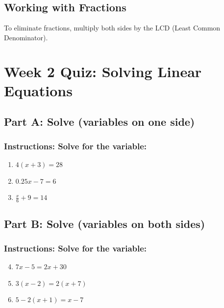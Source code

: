 \documentclass[12pt]{article}
\begin{document}
	    \subsection*{Working with Fractions}
        	To eliminate fractions, multiply both sides by the LCD (Least Common Denominator).

            \newpage

    \section*{Week 2 Quiz: Solving Linear Equations}
	
        \subsection*{Part A: Solve (variables on one side)}
            
            \subsubsection*{Instructions: Solve for the variable:}

                \begin{enumerate}
                    \item $4(x + 3) = 28$
                    \item $0.25x - 7 = 6$
                    \item $\frac{x}{6} + 9 = 14$
                \end{enumerate}
        
        \subsection*{Part B: Solve (variables on both sides)}
            
            \subsubsection*{Instructions: Solve for the variable:}

                \begin{enumerate}
                    \setcounter{enumi}{3}
                    \item $7x - 5 = 2x + 30$
                    \item $3(x - 2) = 2(x + 7)$
                    \item $5 - 2(x + 1) = x - 7$
                \end{enumerate}
        
\end{document}

